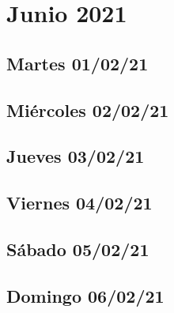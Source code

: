 \section{Junio 2021}

\subsection*{Martes 01/02/21}
\subsection*{Miércoles 02/02/21}
\subsection*{Jueves 03/02/21}
\subsection*{Viernes 04/02/21}
\subsection*{Sábado 05/02/21}
\subsection*{Domingo 06/02/21}



\clearpage